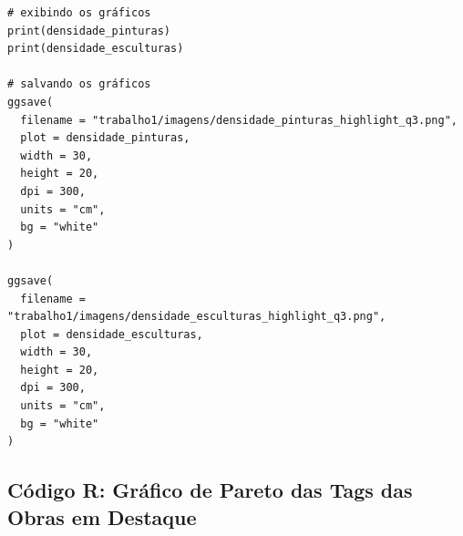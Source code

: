 \documentclass[11pt,a4paper]{article}
\begin{document}
\begin{verbatim}
# exibindo os gráficos
print(densidade_pinturas)
print(densidade_esculturas)

# salvando os gráficos
ggsave(
  filename = "trabalho1/imagens/densidade_pinturas_highlight_q3.png",
  plot = densidade_pinturas,
  width = 30,
  height = 20,
  dpi = 300,
  units = "cm",
  bg = "white"
)

ggsave(
  filename = "trabalho1/imagens/densidade_esculturas_highlight_q3.png",
  plot = densidade_esculturas,
  width = 30,
  height = 20,
  dpi = 300,
  units = "cm",
  bg = "white"
) 
\end{verbatim}

\subsection*{Código R: Gráfico de Pareto das Tags das Obras em Destaque}
\label{anx:codigo_pareto_tags_highlight}
\end{document}
